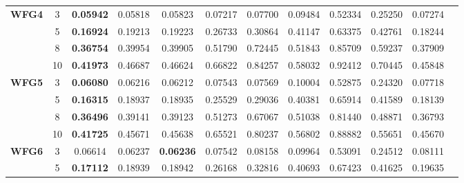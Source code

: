 \documentclass{sig-alternate}
\begin{document}
\begin{table}[!htb]
\begin{tabular}{|c|c|c|c|c|c|c|c|c|c|c|c|}
		\multirow{4}{*}{\textbf{WFG4}}  & 3          & \textbf{0.05942} & 0.05818           & 0.05823               & 0.07217          & 0.07700             & 0.09484             & 0.52334            & 0.25250              & 0.07274          \\ \cline{2-11} 
		& 5          & \textbf{0.16924} & 0.19213           & 0.19223               & 0.26733          & 0.30864             & 0.41147             & 0.63375            & 0.42761              & 0.18244          \\ \cline{2-11} 
		& 8          & \textbf{0.36754} & 0.39954           & 0.39905               & 0.51790          & 0.72445             & 0.51843             & 0.85709            & 0.59237              & 0.37909          \\ \cline{2-11} 
		& 10         & \textbf{0.41973} & 0.46687           & 0.46624               & 0.66822          & 0.84257             & 0.58032             & 0.92412            & 0.70445              & 0.45848          \\ \hline
		\multirow{4}{*}{\textbf{WFG5}}  & 3          & \textbf{0.06080} & 0.06216           & 0.06212               & 0.07543          & 0.07569             & 0.10004             & 0.52875            & 0.24320              & 0.07718          \\ \cline{2-11} 
		& 5          & \textbf{0.16315} & 0.18937           & 0.18935               & 0.25529          & 0.29036             & 0.40381             & 0.65914            & 0.41589              & 0.18139          \\ \cline{2-11} 
		& 8          & \textbf{0.36496} & 0.39141           & 0.39123               & 0.51273          & 0.67067             & 0.51038             & 0.81440            & 0.48871              & 0.36793          \\ \cline{2-11} 
		& 10         & \textbf{0.41725} & 0.45671           & 0.45638               & 0.65521          & 0.80237             & 0.56802             & 0.88882            & 0.55651              & 0.45670          \\ \hline
		\multirow{4}{*}{\textbf{WFG6}}  & 3          & 0.06614          & 0.06237           & \textbf{0.06236}      & 0.07542          & 0.08158             & 0.09964             & 0.53091            & 0.24512              & 0.08111          \\ \cline{2-11} 
		& 5          & \textbf{0.17112} & 0.18939           & 0.18942               & 0.26168          & 0.32816             & 0.40693             & 0.67423            & 0.41625              & 0.19635          \\ \cline{2-11} 

\end{tabular}
\end{table}
\end{document}
